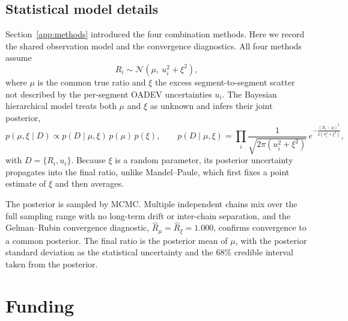 \documentclass[11pt,a4paper]{article}
\begin{document}


\subsection{Statistical model details}
\label{app:stats}

Section~\ref{app:methods} introduced the four combination methods. Here
we record the shared observation model and the convergence diagnostics.
All four methods assume
\begin{equation}
  R_i \sim \mathcal{N}\!\left(\mu,\ u_i^{2} + \xi^{2}\right),
  \label{eq:obs}
\end{equation}
where $\mu$ is the common true ratio and $\xi$ the excess
segment-to-segment scatter not described by the per-segment OADEV
uncertainties $u_i$. The Bayesian hierarchical model treats both $\mu$
and $\xi$ as unknown and infers their joint posterior,
\begin{equation}
  p(\mu,\xi \mid D) \propto p(D \mid \mu,\xi)\,p(\mu)\,p(\xi),
  \qquad
  p(D\mid\mu,\xi) = \prod_i
    \frac{1}{\sqrt{2\pi(u_i^{2}+\xi^{2})}}\,
    e^{-\frac{(R_i-\mu)^{2}}{2(u_i^{2}+\xi^{2})}},
  \label{eq:bayes}
\end{equation}
with $D = \{R_i, u_i\}$. Because $\xi$ is a random parameter, its
posterior uncertainty propagates into the final ratio, unlike
Mandel--Paule, which first fixes a point estimate of $\xi$ and then
averages.

The posterior is sampled by MCMC. Multiple independent chains mix over
the full sampling range with no long-term drift or inter-chain
separation, and the Gelman--Rubin convergence diagnostic,
$\hat{R}_{\mu} = \hat{R}_{\xi} = 1.000$, confirms convergence to a common
posterior. The final ratio is the posterior mean of $\mu$, with the
posterior standard deviation as the statistical uncertainty and the $68\%$
credible interval taken from the posterior.



\section*{Funding}
\end{document}
